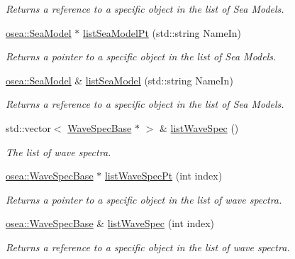 \begin{DoxyCompactItemize}
\begin{DoxyCompactList}\small\item\em Returns a reference to a specific object in the list of Sea Models. \end{DoxyCompactList}\item 
\hyperlink{classosea_1_1_sea_model}{osea\-::\-Sea\-Model} $\ast$ \hyperlink{classosea_1_1ofreq_1_1_system_a7a8d5ef39643f96b8808d3e82073535b}{list\-Sea\-Model\-Pt} (std\-::string Name\-In)
\begin{DoxyCompactList}\small\item\em Returns a pointer to a specific object in the list of Sea Models. \end{DoxyCompactList}\item 
\hyperlink{classosea_1_1_sea_model}{osea\-::\-Sea\-Model} \& \hyperlink{classosea_1_1ofreq_1_1_system_a793b3a7bf58831606964fc290be2e778}{list\-Sea\-Model} (std\-::string Name\-In)
\begin{DoxyCompactList}\small\item\em Returns a reference to a specific object in the list of Sea Models. \end{DoxyCompactList}\item 
std\-::vector$<$ \hyperlink{classosea_1_1_wave_spec_base}{Wave\-Spec\-Base} $\ast$ $>$ \& \hyperlink{classosea_1_1ofreq_1_1_system_a16f3bda6ea1b6f0d9644ad4a551996a2}{list\-Wave\-Spec} ()
\begin{DoxyCompactList}\small\item\em The list of wave spectra. \end{DoxyCompactList}\item 
\hyperlink{classosea_1_1_wave_spec_base}{osea\-::\-Wave\-Spec\-Base} $\ast$ \hyperlink{classosea_1_1ofreq_1_1_system_a98b580fc4f9ab6cb0a57cd0968b1b1b4}{list\-Wave\-Spec\-Pt} (int index)
\begin{DoxyCompactList}\small\item\em Returns a pointer to a specific object in the list of wave spectra. \end{DoxyCompactList}\item 
\hyperlink{classosea_1_1_wave_spec_base}{osea\-::\-Wave\-Spec\-Base} \& \hyperlink{classosea_1_1ofreq_1_1_system_a3b4f1f07971a0080a91882ccda00d80e}{list\-Wave\-Spec} (int index)
\begin{DoxyCompactList}\small\item\em Returns a reference to a specific object in the list of wave spectra. \end{DoxyCompactList}\item 

\end{DoxyCompactItemize}
